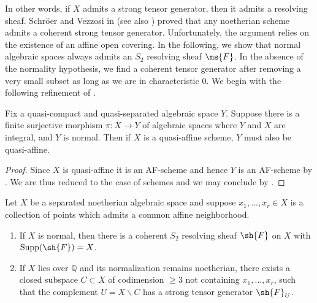 \documentclass[12pt]{amsart}
\begin{document}


In other words, if $X$ admits a strong tensor generator, then it admits a resolving sheaf. Schr\"oer and Vezzosi in \cite[Prop. 2.2]{NormalSurfaceRes} (see also \cite[Ex. 1.3]{GrossRes}) proved that any noetherian scheme admits a coherent strong tensor generator. Unfortunately, the argument relies on the existence of an affine open covering. In the following, we show that normal algebraic spaces always admits an $S_2$ resolving sheaf $\ms{F}$. In the absence of the normality hypothesis, we find a coherent tensor generator after removing a very small subset as long as we are in characteristic $0$. We begin with the following refinement of \cite[Tag 0BD1]{stacks}. 

\begin{lemma} \label{lem:quasiaffine} Fix a quasi-compact and quasi-separated algebraic space $Y$. Suppose there is a finite surjective morphism $\pi: X \to Y$ of algebraic spaces where $Y$ and $X$ are integral, and $Y$ is normal. Then if $X$ is a quasi-affine scheme, $Y$ must also be quasi-affine. \end{lemma}

\begin{proof} Since $X$ is quasi-affine it is an AF-scheme and hence $Y$ is an AF-scheme by \cite[Thm. 1.2]{GrossRes}. We are thus reduced to the case of schemes and we may conclude by \cite[Tags 0BD1, 0BD3]{stacks}. \end{proof}



\begin{proposition} \label{prop:singlesheaf} Let $X$ be a separated noetherian algebraic space and suppose $x_1,...,x_r \in X$ is a collection of points which admits a common affine neighborhood. 

\begin{enumerate} 
\item If $X$ is normal, then there is a coherent $S_2$ resolving sheaf $\sh{F}$ on $X$ with $\mathrm{Supp}(\sh{F})=X$. \item If $X$ lies over $\mathbb{Q}$ and its normalization remains noetherian, there exists a closed subspace $C \subset X$ of codimension $\geq 3$ not containing $x_1,...,x_r$, such that the complement $U=X \smallsetminus C$ has a strong tensor generator $\sh{F}_U$.
\end{enumerate}


\end{proposition}
\end{document}

